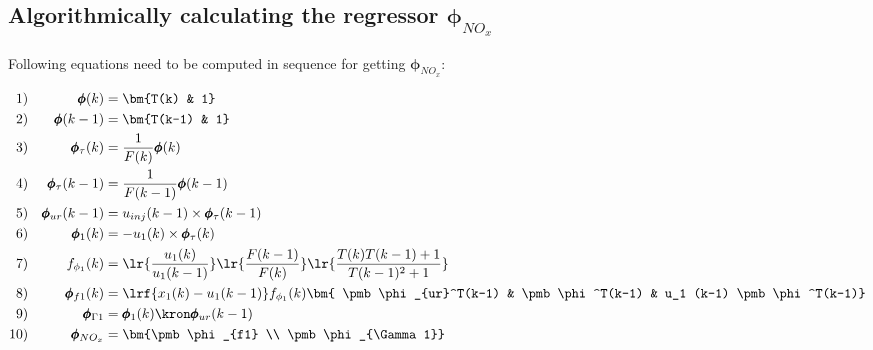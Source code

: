 \subsection{Algorithmically calculating the regressor $\pmb \phi_{NO_x}$}

Following equations need to be computed in sequence for getting $\pmb \phi_{NO_x}$:


\begin{align*}
        1)&& \pmb \phi(k) &= \bm{T(k) & 1}\\
        2)&& \pmb \phi(k-1) &= \bm{T(k-1) & 1} \\
        3)&& \pmb \phi_\tau(k) &= \frac{1}{F(k)} \pmb \phi(k)\\
        4)&& \pmb \phi_\tau(k-1)&= \frac{1}{F(k-1)} \pmb \phi(k-1)\\
        5)&& \pmb \phi_{ur}(k-1)&= u_{inj}(k-1) \times \pmb \phi_\tau (k-1) \\
        6)&& \pmb \phi_1(k) &= -u_1(k) \times \pmb \phi_\tau(k)\\
        7)&& f_{\phi_1}(k) &= \lr{\frac{u_1(k)}{u_1(k-1)}}
                                \lr{\frac{F(k-1)}{F(k)}}
                                        \lr{\frac{T(k)T(k-1) + 1}{T(k-1)^2 + 1}}\\
        8)&& \pmb \phi_{f1}(k) &= \lrf{{x_1(k) - u_1(k-1)}} f_{\phi_1}(k)
                                \bm{ \pmb \phi_{ur}^T(k-1) &
                                    \pmb \phi^T(k-1)  &
                                    u_1 (k-1) \pmb \phi^T(k-1)}   \\
        9)&& \pmb \phi_{\Gamma 1} &= \pmb \phi_1 (k) \kron \pmb \phi_{ur} (k-1) \\
        10)&& \pmb \phi_{NO_x} &= \bm{\pmb \phi_{f1} \\ \pmb \phi_{\Gamma 1}}
\end{align*}
